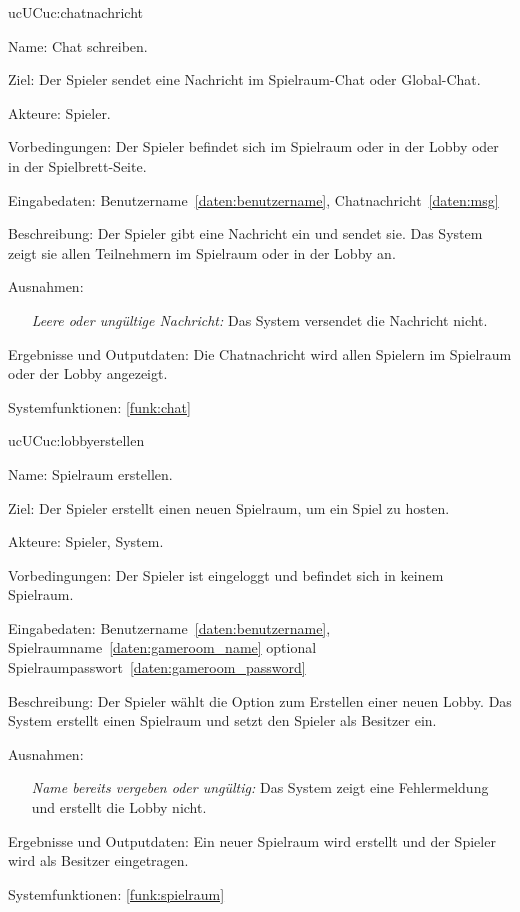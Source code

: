 \begin{description}[leftmargin=5em, style=sameline]
    \begin{lhp}{uc}{UC}{uc:chatnachricht}
    \item [Name:] Chat schreiben.
    \item [Ziel:] Der Spieler sendet eine Nachricht im Spielraum-Chat oder Global-Chat.
    \item [Akteure:] Spieler.
    \item [Vorbedingungen:] Der Spieler befindet sich im Spielraum oder in der Lobby oder in der Spielbrett-Seite.
    \item [Eingabedaten:] Benutzername~\ref{daten:benutzername}, Chatnachricht~\ref{daten:msg}
    \item [Beschreibung:] Der Spieler gibt eine Nachricht ein und sendet sie. Das System zeigt sie allen Teilnehmern im Spielraum oder in der Lobby an.
    \item [Ausnahmen:] \hfill
        \begin{itemize}
            \item[] \textit{Leere oder ungültige Nachricht:} Das System versendet die Nachricht nicht.
        \end{itemize}
    \item [Ergebnisse und Outputdaten:] Die Chatnachricht wird allen Spielern im Spielraum oder der Lobby angezeigt.
    \item [Systemfunktionen:] \ref{funk:chat} 
    \end{lhp}

    \begin{lhp}{uc}{UC}{uc:lobbyerstellen}
    \item [Name:] Spielraum erstellen.
    \item [Ziel:] Der Spieler erstellt einen neuen Spielraum, um ein Spiel zu hosten.
    \item [Akteure:] Spieler, System.
    \item [Vorbedingungen:] Der Spieler ist eingeloggt und befindet sich in keinem Spielraum.
    \item [Eingabedaten:] Benutzername~\ref{daten:benutzername}, Spielraumname~\ref{daten:gameroom_name} optional Spielraumpasswort~\ref{daten:gameroom_password}
    \item [Beschreibung:] Der Spieler wählt die Option zum Erstellen einer neuen Lobby. Das System erstellt einen Spielraum und setzt den Spieler als Besitzer ein.
    \item [Ausnahmen:] \hfill
        \begin{itemize}
            \item[] \textit{Name bereits vergeben oder ungültig:} Das System zeigt eine Fehlermeldung und erstellt die Lobby nicht.
        \end{itemize}
    \item [Ergebnisse und Outputdaten:] Ein neuer Spielraum wird erstellt und der Spieler wird als Besitzer eingetragen.
    \item [Systemfunktionen:] \ref{funk:spielraum}
    \end{lhp}
    

\end{description}
